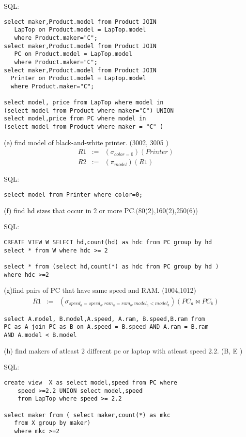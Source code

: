 \documentclass{article}
\begin{document}
SQL:
\begin{verbatim}
select maker,Product.model from Product JOIN 
   LapTop on Product.model = LapTop.model 
   where Product.maker="C";
select maker,Product.model from Product JOIN 
   PC on Product.model = LapTop.model 
   where Product.maker="C";
select maker,Product.model from Product JOIN 
  Printer on Product.model = LapTop.model 
  where Product.maker="C";

select model, price from LapTop where model in 
(select model from Product where maker="C") UNION 
select model,price from PC where model in 
(select model from Product where maker = "C" )
\end{verbatim}

(e) find model of black-and-white printer. (3002, 3005 )
\begin{eqnarray}
R1 &:=& (\sigma_{color=0})(Printer) \\
R2 &:=& (\pi_{model})(R1)
\end{eqnarray}

SQL:
\begin{verbatim}
select model from Printer where color=0;
\end{verbatim}

(f) find hd sizes that occur in 2 or more PC.(80(2),160(2),250(6))



SQL:
\begin{verbatim}
CREATE VIEW W SELECT hd,count(hd) as hdc from PC group by hd
select * from W where hdc >= 2

select * from (select hd,count(*) as hdc from PC group by hd ) 
where hdc >=2
\end{verbatim}

(g)find pairs of PC that have same speed and RAM.
(1004,1012)
\begin{eqnarray}
R1 &:=& (\sigma_{speed_{a}=speed_{b},ram_{a}=ram_{b},model_{a} < model_{b}})(PC_a \Join PC_b )
\end{eqnarray}

\begin{verbatim}
select A.model, B.model,A.speed, A.ram, B.speed,B.ram from 
PC as A join PC as B on A.speed = B.speed AND A.ram = B.ram 
AND A.model < B.model
\end{verbatim}

(h) find makers of atleast 2 different pc or laptop with atleast speed 2.2.
(B, E )

SQL: 
\begin{verbatim}
create view  X as select model,speed from PC where 
    speed >=2.2 UNION select model,speed 
    from LapTop where speed >= 2.2

select maker from ( select maker,count(*) as mkc 
   from X group by maker) 
   where mkc >=2 
\end{verbatim}
\end{document}
